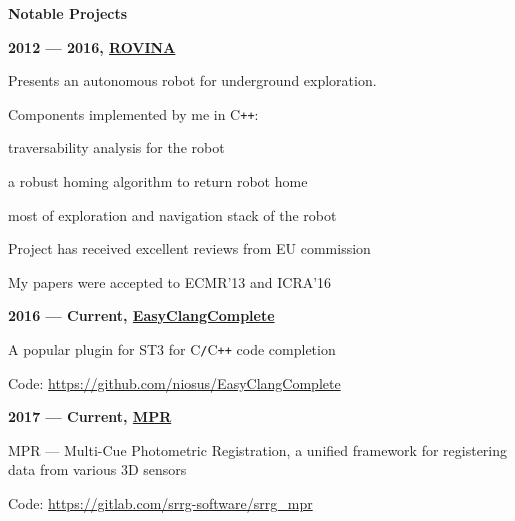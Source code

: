 \documentclass[a4paper,12pt,final]{memoir}
\newcommand{\SmallSep}{\vspace{0.5em}}
\newcommand{\CVSection}[1]
	{\Large\textbf{#1}\par
	\SmallSep\normalsize\normalfont}
\newcommand{\CVItem}[1]
	{\textbf{\color{MidnightBlue} #1}}
\begin{document}
\CVSection{Notable Projects}
\CVItem{2012 --- 2016, \href{http://www.rovina-project.eu/}{ROVINA}}
\begin{compactitem}[\color{MidnightBlue}$\circ$]
	\item Presents an autonomous robot for underground exploration.
	\item Components implemented by me in C\texttt{++}:
	\begin{compactitem}[\color{MidnightBlue}$-$]
	 	\item traversability analysis for the robot
	 	\item a robust homing algorithm to return robot home
		\item most of exploration and navigation stack of the robot
	 \end{compactitem}
	\item Project has received excellent reviews from EU commission
	\item My papers were accepted to ECMR'13 and ICRA'16
\end{compactitem}
\CVItem{2016 --- Current, \href{https://github.com/niosus/EasyClangComplete}{EasyClangComplete}}
\begin{compactitem}[\color{MidnightBlue}$\circ$]
	\item A popular plugin for ST3 for C\texttt{/}C\texttt{++} code completion
	\item Code: \href{https://github.com/niosus/EasyClangComplete}{https://github.com/niosus/EasyClangComplete}
\end{compactitem}
\CVItem{2017 --- Current, \href{https://gitlab.com/srrg-software/srrg_mpr}{MPR}}
\begin{compactitem}[\color{MidnightBlue}$\circ$]
	\item MPR --- Multi-Cue Photometric Registration, a unified framework for
	registering data from various 3D sensors
	\item Code: \href{https://gitlab.com/srrg-software/srrg_mpr}{https://gitlab.com/srrg-software/srrg\_mpr}
\end{compactitem}
\SmallSep
\end{document}
